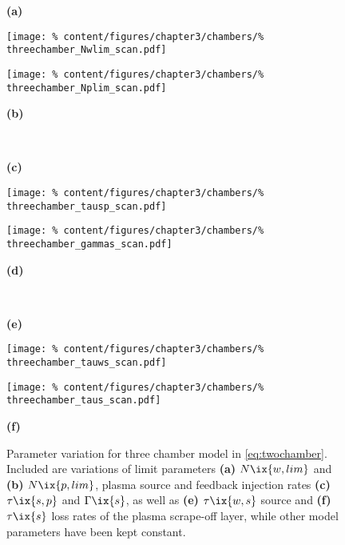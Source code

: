 %
            \begin{figure}[t]%
                \parbox{0.02\linewidth}{%
                    \textbf{(a)}}%
                \quad%
                \parbox{0.42\linewidth}{%
                    \texttt{[image: \%
                        content/figures/chapter3/chambers/\%
                        threechamber\_Nwlim\_scan.pdf]}}%
                \quad%
                \parbox{0.42\linewidth}{%
                    \texttt{[image: \%
                        content/figures/chapter3/chambers/\%
                        threechamber\_Nplim\_scan.pdf]}}%
                \quad%
                \parbox{0.02\linewidth}{%
                    \textbf{(b)}}%
                \,\\%
                \parbox{0.02\linewidth}{%
                    \textbf{(c)}}%
                \quad%
                \parbox{0.42\linewidth}{%
                    \texttt{[image: \%
                        content/figures/chapter3/chambers/\%
                        threechamber\_tausp\_scan.pdf]}}%
                \quad%
                \parbox{0.42\linewidth}{%
                    \texttt{[image: \%
                        content/figures/chapter3/chambers/\%
                        threechamber\_gammas\_scan.pdf]}}%
                \quad%
                \parbox{0.02\linewidth}{%
                    \textbf{(d)}}%
                \,\\%
                \parbox{0.02\linewidth}{%
                    \textbf{(e)}}%
                \quad%
                \parbox{0.42\linewidth}{%
                    \texttt{[image: \%
                        content/figures/chapter3/chambers/\%
                        threechamber\_tauws\_scan.pdf]}}%
                \quad%
                \parbox{0.42\linewidth}{%
                    \texttt{[image: \%
                        content/figures/chapter3/chambers/\%
                        threechamber\_taus\_scan.pdf]}}%
                \quad%
                \parbox{0.02\linewidth}{%
                    \textbf{(f)}}%
                \caption{Parameter variation for three chamber model in \cref{eq:twochamber}. Included are variations of limit parameters \textbf{(a)} $N\ix{w,lim}$ and \textbf{(b)} $N\ix{p,lim}$,  plasma source and feedback injection rates \textbf{(c)} $\tau\ix{s,p}$ and $\Gamma\ix{s}$, as well as \textbf{(e)} $\tau\ix{w,s}$ source and \textbf{(f)} $\tau\ix{s}$ loss rates of the plasma scrape-off layer, while other model parameters have been kept constant.%
                }\label{fig:threechamber_scan}%
            \end{figure}%
